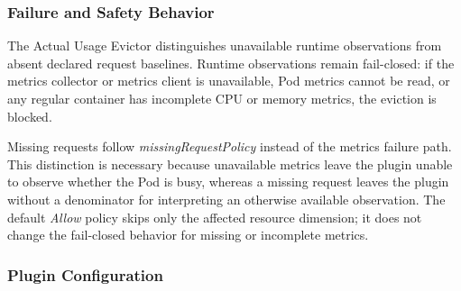 \subsubsection{Failure and Safety Behavior}
\label{sec:actualusage_safety}

The Actual Usage Evictor distinguishes unavailable runtime observations from absent declared request baselines. Runtime observations remain fail-closed: if the metrics collector or metrics client is unavailable, Pod metrics cannot be read, or any regular container has incomplete CPU or memory metrics, the eviction is blocked.

Missing requests follow \textit{missingRequestPolicy} instead of the metrics failure path. This distinction is necessary because unavailable metrics leave the plugin unable to observe whether the Pod is busy, whereas a missing request leaves the plugin without a denominator for interpreting an otherwise available observation. The default \textit{Allow} policy skips only the affected resource dimension; it does not change the fail-closed behavior for missing or incomplete metrics.

\subsubsection{Plugin Configuration}
\label{sec:actualusage_config}

\begin{table}[tbp]
    \centering
    \caption{Actual Usage Evictor Plugin Arguments}
    \label{tab:actualusage_args}
    \renewcommand{\arraystretch}{1.25}
    \small
\end{table}

